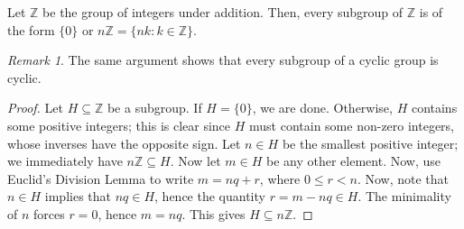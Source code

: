 \documentclass[11pt]{article}
\newcommand{\Z}{\mathbb{Z}}
\theoremstyle{definition}
\theoremstyle{remark}
\newtheorem*{remark}{Remark}
\numberwithin{equation}{section}
\begin{document}
    \begin{theorem}
        Let $\Z$ be the group of integers under addition. Then, every subgroup of
        $\Z$ is of the form $\{0\}$ or $n\Z = \{nk: k \in \Z\}$.
        \begin{remark}
            The same argument shows that every subgroup of a cyclic group is cyclic.
        \end{remark}
    \end{theorem}
    \begin{proof}
        Let $H \subseteq \Z$ be a subgroup. If $H = \{0\}$, we are done.  Otherwise,
        $H$ contains some positive integers; this is clear since $H$ must contain
        some non-zero integers, whose inverses have the opposite sign. Let $n \in H$
        be the smallest positive integer; we immediately have $n\Z \subseteq H$. Now
        let $m \in H$ be any other element.  Now, use Euclid's Division Lemma to
        write $m = nq + r$, where $0 \leq r < n$.  Now, note that $n \in H$ implies
        that $nq \in H$, hence the quantity $r = m - nq \in H$. The minimality of $n$
        forces $r = 0$, hence $m = nq$. This gives $H \subseteq n\Z$.
    \end{proof}
    
\end{document}
